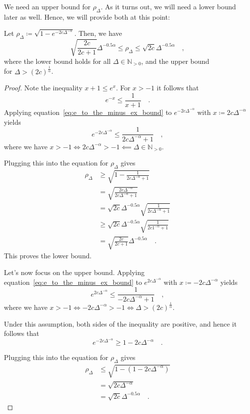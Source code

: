 \documentclass[../../main.tex]{subfiles}
\begin{document}
We need an upper bound for $\rho_\Delta$. As it turns out, we will need a lower bound later as well. Hence, we will provide both at this point:

\begin{lemma}
    \label{lemma:bounding_rho}
    Let $\rho_\Delta \coloneqq \sqrt{1 - e^{-2c \Delta^{-\alpha}}}$. Then, we have
    \[
        \sqrt{\frac{2c}{2c + 1}} \Delta^{-0.5 \alpha} \leq \rho_\Delta \leq \sqrt{2c} \Delta^{-0.5 \alpha} \quad ,
    \]
    where the lower bound holds for all $\Delta \in \mathbb{N}_{>0}$, and the upper bound \\ for $\Delta > (2c)^{\frac{1}{\alpha}}$.
\end{lemma}

\begin{proof}
    Note the inequality $x + 1 \leq e^x$. For $x > -1$ it follows that
    \begin{equation}
        e^{-x} \leq \frac{1}{x + 1} \label{eq:e_to_the_minus_ex_bound} \quad .
    \end{equation}
    Applying equation~\ref{eq:e_to_the_minus_ex_bound} to $e^{-2c \Delta^{-\alpha}}$ with $x \coloneqq 2c \Delta^{-\alpha}$ yields
    \[
        e^{-2c \Delta^{-\alpha}} \leq \frac{1}{2c \Delta^{-\alpha} + 1} \quad ,
    \]
    where we have $x > -1 \iff 2c \Delta^{-\alpha} > -1 \impliedby \Delta \in \mathbb{N}_{>0}$.

    Plugging this into the equation for $\rho_\Delta$ gives
    \begin{align*}
        \rho_\Delta &\geq \sqrt{1 - \frac{1}{2c \Delta^{-\alpha} + 1}} \\
        &= \sqrt{\frac{2c \Delta^{-\alpha}}{2c \Delta^{-\alpha} + 1}} \\
        &= \sqrt{2c} \Delta^{-0.5\alpha} \sqrt{\frac{1}{2c \Delta^{-\alpha} + 1}} \\
        &\geq \sqrt{2c} \Delta^{-0.5\alpha} \sqrt{\frac{1}{2c 1^{-\alpha} + 1}} \\
        &= \sqrt{\frac{2c}{2c + 1}} \Delta^{-0.5 \alpha} \quad .
    \end{align*}
    This proves the lower bound.

    Let's now focus on the upper bound. Applying equation~\ref{eq:e_to_the_minus_ex_bound} to $e^{2c \Delta^{-\alpha}}$ with $x \coloneqq -2c \Delta^{-\alpha}$ yields
    \[
        e^{2c \Delta^{-\alpha}} \leq \frac{1}{-2c \Delta^{-\alpha} + 1} \quad ,
    \]
    where we have $x > -1 \iff -2c \Delta^{-\alpha} > -1 \iff \Delta > (2c)^{\frac{1}{\alpha}}$.

    Under this assumption, both sides of the inequality are positive, and hence it follows that
    \[
        e^{-2c \Delta^{-\alpha}} \geq 1 -2c \Delta^{-\alpha} \quad .
    \]

    Plugging this into the equation for $\rho_\Delta$ gives
    \begin{align*}
        \rho_\Delta &\leq \sqrt{1 - (1 -2c \Delta^{-\alpha})} \\
        &= \sqrt{2c \Delta^{-\alpha}} \\
        &= \sqrt{2c} \Delta^{-0.5\alpha} \quad .
    \end{align*}
\end{proof}
\end{document}
